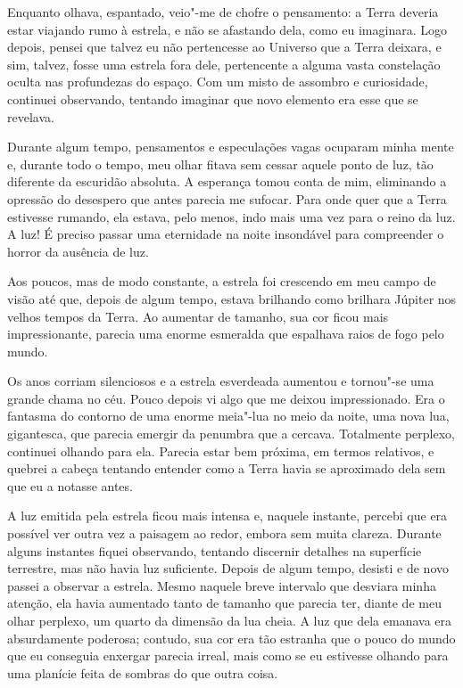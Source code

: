 Enquanto olhava, espantado, veio"-me de chofre o pensamento: a Terra deveria estar viajando rumo à estrela, e não se
afastando dela, como eu imaginara. Logo depois, pensei que talvez eu não pertencesse ao Universo que a Terra deixara,
e sim, talvez, fosse uma estrela fora dele, pertencente a alguma vasta constelação oculta nas profundezas do espaço.
Com um misto de assombro e curiosidade, continuei observando, tentando imaginar que novo elemento era esse que se
revelava.

Durante algum tempo, pensamentos e especulações vagas ocuparam minha mente e, durante todo o tempo, meu olhar fitava sem
cessar aquele ponto de luz, tão diferente da escuridão absoluta. A esperança tomou conta de mim, eliminando a opressão
do desespero que antes parecia me sufocar. Para onde quer que a Terra estivesse rumando, ela estava, pelo menos, indo
mais uma vez para o reino da luz. A luz! É preciso passar uma eternidade na noite insondável para compreender o horror
da ausência de luz.

Aos poucos, mas de modo constante, a estrela foi crescendo em meu campo de visão até que, depois de algum tempo, estava
brilhando como brilhara Júpiter nos velhos tempos da Terra. Ao aumentar de tamanho, sua cor ficou mais impressionante,
parecia uma enorme esmeralda que espalhava raios de fogo pelo mundo.

Os anos corriam silenciosos e a estrela esverdeada aumentou e tornou"-se uma grande chama no céu. Pouco depois
vi algo que me deixou impressionado. Era o fantasma do contorno de uma enorme meia"-lua no meio da noite, uma nova lua,
gigantesca, que parecia emergir da penumbra que a cercava. Totalmente perplexo, continuei olhando para ela. Parecia
estar bem próxima, em termos relativos, e quebrei a cabeça tentando entender como a Terra havia se aproximado dela sem
que eu a notasse antes.

A luz emitida pela estrela ficou mais intensa e, naquele instante, percebi que era possível ver outra vez a paisagem
ao redor, embora sem muita clareza. Durante alguns instantes fiquei observando, tentando discernir detalhes na
superfície terrestre, mas não havia luz suficiente. Depois de algum tempo, desisti e de novo passei a observar a
estrela. Mesmo naquele breve intervalo que desviara minha atenção, ela havia aumentado tanto de tamanho que
parecia ter, diante de meu olhar perplexo, um quarto da dimensão da lua cheia. A luz que dela emanava era absurdamente
poderosa; contudo, sua cor era tão estranha que o pouco do mundo que eu conseguia enxergar parecia irreal, mais como se
eu estivesse olhando para uma planície feita de sombras do que outra coisa.

